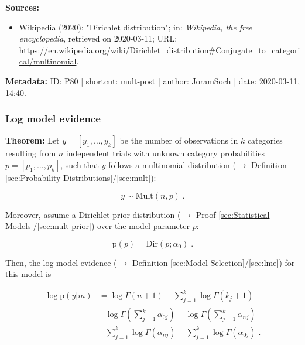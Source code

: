 \documentclass[a4paper,12pt,twoside]{book}
\begin{document}
\vspace{1em}
\textbf{Sources:}
\begin{itemize}
\item Wikipedia (2020): "Dirichlet distribution"; in: \textit{Wikipedia, the free encyclopedia}, retrieved on 2020-03-11; URL: \url{https://en.wikipedia.org/wiki/Dirichlet_distribution#Conjugate_to_categorical/multinomial}.
\end{itemize}


\vspace{1em}
\textbf{Metadata:} ID: P80 | shortcut: mult-post | author: JoramSoch | date: 2020-03-11, 14:40.
\vspace{1em}



\subsubsection[\textbf{Log model evidence}]{Log model evidence} \label{sec:mult-lme}
\setcounter{equation}{0}

\textbf{Theorem:} Let $y = [y_1, \ldots, y_k]$ be the number of observations in $k$ categories resulting from $n$ independent trials with unknown category probabilities $p = [p_1, \ldots, p_k]$, such that $y$ follows a multinomial distribution ($\rightarrow$ Definition \ref{sec:Probability Distributions}/\ref{sec:mult}):

\begin{equation} \label{eq:mult-lme-Mult}
y \sim \mathrm{Mult}(n,p) \; .
\end{equation}

Moreover, assume a Dirichlet prior distribution ($\rightarrow$ Proof \ref{sec:Statistical Models}/\ref{sec:mult-prior}) over the model parameter $p$:

\begin{equation} \label{eq:mult-lme-Mult-prior}
\mathrm{p}(p) = \mathrm{Dir}(p; \alpha_0) \; .
\end{equation}

Then, the log model evidence ($\rightarrow$ Definition \ref{sec:Model Selection}/\ref{sec:lme}) for this model is

\begin{equation} \label{eq:mult-lme-Mult-LME}
\begin{split}
\log \mathrm{p}(y|m) &= \log \Gamma(n+1) - \sum_{j=1}^{k} \log \Gamma(k_j+1) \\
&+ \log \Gamma \left( \sum_{j=1}^{k} \alpha_{0j} \right) - \log \Gamma \left( \sum_{j=1}^{k} \alpha_{nj} \right) \\
&+ \sum_{j=1}^k \log \Gamma(\alpha_{nj}) - \sum_{j=1}^k \log \Gamma(\alpha_{0j}) \; .
\end{split}
\end{equation}
\end{document}
